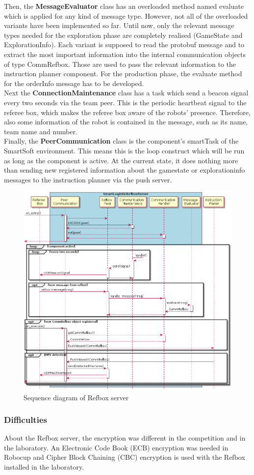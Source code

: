 Then, the \textbf{MessageEvaluator} class has an overloaded method named evaluate which is applied for any kind of message type. However, not all of the overloaded variants have been implemented so far. Until now, only the relevant message types needed for the exploration phase are completely realised (GameState and ExplorationInfo). Each variant is supposed to read the protobuf message and to extract the most important information into the internal communication objects of type CommRefbox. Those are used to pass the relevant information to the instruction planner component. For the production phase, the evaluate method for the orderInfo message has to be developed.\\

Next the \textbf{ConnectionMaintenance} class has a task which send a beacon signal every two seconds via the team peer. This is the periodic heartbeat signal to the referee box, which makes the referee box aware of the robots’ presence. Therefore, also some information of the robot is contained in the message, such as its name, team name and number.\\

Finally, the \textbf{PeerCommunication} class is the component’s smartTask of the SmartSoft environment. This means this is the loop construct which will be run as long as the component is active. At the current state, it does nothing more than sending new registered information about the gamestate or explorationinfo messages to the instruction planner via the push server.\\

\begin{figure}[!h]
\centering
\includegraphics[width=\linewidth]{pic/sequence_diagram_RefboxServer.png}
\caption{Sequence diagram of Refbox server}
\label{fig:sequenceDiagramRefboxServer}
\end{figure}


\subsubsection{Difficulties}

About the Refbox server, the encryption was different in the competition and in the laboratory. An Electronic Code Book (ECB) encryption was needed in Robocup and Cipher Block Chaining (CBC) encryption is used with the Refbox installed in the laboratory. \\